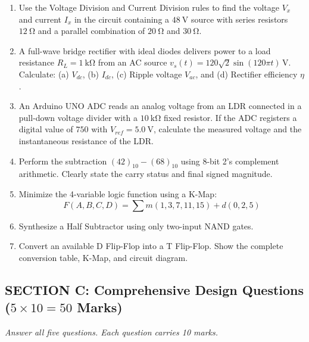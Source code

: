 \begin{enumerate}[label=\textbf{Q\arabic*.}, leftmargin=2em, start=11]
    \item Use the Voltage Division and Current Division rules to find the voltage $V_x$ and current $I_x$ in the circuit containing a $\SI{48}{\volt}$ source with series resistors $\SI{12}{\ohm}$ and a parallel combination of $\SI{20}{\ohm}$ and $\SI{30}{\ohm}$.
    \item A full-wave bridge rectifier with ideal diodes delivers power to a load resistance $R_L = \SI{1}{\kilo\ohm}$ from an AC source $v_s(t) = 120\sqrt{2}\sin(120\pi t)\,\si{\volt}$. Calculate: (a) $V_{dc}$, (b) $I_{dc}$, (c) Ripple voltage $V_{ac}$, and (d) Rectifier efficiency $\eta$.
    \item An Arduino UNO ADC reads an analog voltage from an LDR connected in a pull-down voltage divider with a $\SI{10}{\kilo\ohm}$ fixed resistor. If the ADC registers a digital value of $750$ with $V_{ref} = \SI{5.0}{\volt}$, calculate the measured voltage and the instantaneous resistance of the LDR.
    \item Perform the subtraction $(42)_{10} - (68)_{10}$ using 8-bit 2's complement arithmetic. Clearly state the carry status and final signed magnitude.
    \item Minimize the 4-variable logic function using a K-Map:
    $$F(A,B,C,D) = \sum m(1, 3, 7, 11, 15) + d(0, 2, 5)$$
    \item Synthesize a Half Subtractor using only two-input NAND gates.
    \item Convert an available D Flip-Flop into a T Flip-Flop. Show the complete conversion table, K-Map, and circuit diagram.
\end{enumerate}

\subsection*{SECTION C: Comprehensive Design Questions ($5 \times 10 = 50$ Marks)}
\noindent\textit{Answer all five questions. Each question carries 10 marks.}

